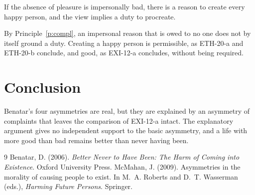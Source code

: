 \documentclass{situationist-preprint}
\begin{document}
\begin{objection}
If the absence of pleasure is impersonally bad, there is a reason to create every happy person, and the view implies a duty to procreate.
\end{objection}

\begin{reply}
By Principle~\ref{p:compl}, an impersonal reason that is owed to no one does not by itself ground a duty. Creating a happy person is permissible, as ETH-20-a and ETH-20-b conclude, and good, as EXI-12-a concludes, without being required.
\end{reply}

\section{Conclusion}

Benatar's four asymmetries are real, but they are explained by an asymmetry of complaints that leaves the comparison of EXI-12-a intact. The explanatory argument gives no independent support to the basic asymmetry, and a life with more good than bad remains better than never having been.

\begin{thebibliography}{9}\small
{} Benatar, D. (2006). \emph{Better Never to Have Been: The Harm of Coming into Existence}. Oxford University Press.
 McMahan, J. (2009). Asymmetries in the morality of causing people to exist. In M.~A. Roberts and D.~T. Wasserman (eds.), \emph{Harming Future Persons}. Springer.
\end{thebibliography}
\end{document}
